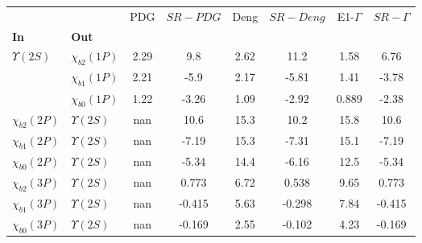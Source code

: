 \begin{tabular}{l|l|c|c|c|c|c|c}
\toprule
                &                &  PDG & $SR-PDG$ &  Deng & $SR-Deng$ &  E1-$\Gamma$ & $SR-\Gamma$ \\
\textbf{In} & \textbf{Out} &      &          &       &           &              &             \\
\midrule
\textbf{$\Upsilon(2S)$} & \textbf{$\chi_{b2}(1P)$} & 2.29 &      9.8 &  2.62 &      11.2 &         1.58 &        6.76 \\
                & \textbf{$\chi_{b1}(1P)$} & 2.21 &     -5.9 &  2.17 &     -5.81 &         1.41 &       -3.78 \\
                & \textbf{$\chi_{b0}(1P)$} & 1.22 &    -3.26 &  1.09 &     -2.92 &        0.889 &       -2.38 \\
\textbf{$\chi_{b2}(2P)$} & \textbf{$\Upsilon(2S)$} &  nan &     10.6 &  15.3 &      10.2 &         15.8 &        10.6 \\
\textbf{$\chi_{b1}(2P)$} & \textbf{$\Upsilon(2S)$} &  nan &    -7.19 &  15.3 &     -7.31 &         15.1 &       -7.19 \\
\textbf{$\chi_{b0}(2P)$} & \textbf{$\Upsilon(2S)$} &  nan &    -5.34 &  14.4 &     -6.16 &         12.5 &       -5.34 \\
\textbf{$\chi_{b2}(3P)$} & \textbf{$\Upsilon(2S)$} &  nan &    0.773 &  6.72 &     0.538 &         9.65 &       0.773 \\
\textbf{$\chi_{b1}(3P)$} & \textbf{$\Upsilon(2S)$} &  nan &   -0.415 &  5.63 &    -0.298 &         7.84 &      -0.415 \\
\textbf{$\chi_{b0}(3P)$} & \textbf{$\Upsilon(2S)$} &  nan &   -0.169 &  2.55 &    -0.102 &         4.23 &      -0.169 \\
\bottomrule
\end{tabular}
